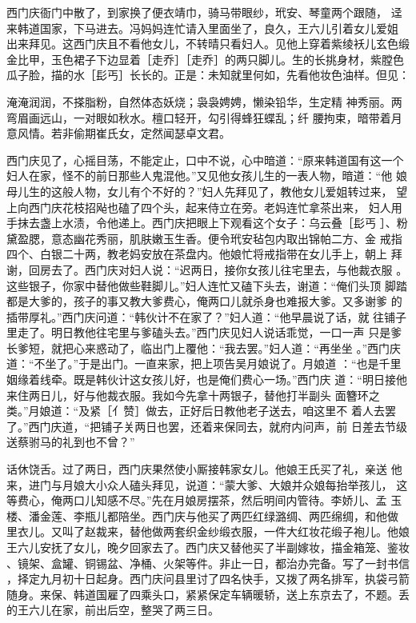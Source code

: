 西门庆衙门中散了，到家换了便衣靖巾，骑马带眼纱，玳安、琴童两个跟随，
迳来韩道国家，下马进去。冯妈妈连忙请入里面坐了，良久，王六儿引着女儿爱姐
出来拜见。这西门庆且不看他女儿，不转晴只看妇人。见他上穿着紫绫袄儿玄色缎
金比甲，玉色裙子下边显着［走乔］［走乔］的两只脚儿。生的长挑身材，紫膛色
瓜子脸，描的水［髟丐］长长的。正是：未知就里何如，先看他妆色油样。但见：

淹淹润润，不搽脂粉，自然体态妖烧；袅袅娉娉，懒染铅华，生定精
神秀丽。两弯眉画远山，一对眼如秋水。檀口轻开，勾引得蜂狂蝶乱；纤
腰拘束，暗带着月意风情。若非偷期崔氏女，定然闻瑟卓文君。

西门庆见了，心摇目荡，不能定止，口中不说，心中暗道：“原来韩道国有这一个
妇人在家，怪不的前日那些人鬼混他。”又见他女孩儿生的一表人物，暗道：“他
娘母儿生的这般人物，女儿有个不好的？”妇人先拜见了，教他女儿爱姐转过来，
望上向西门庆花枝招飐也磕了四个头，起来侍立在旁。老妈连忙拿茶出来，
妇人用手抹去盏上水渍，令他递上。西门庆把眼上下观看这个女子：乌云叠［髟丐
］、粉黛盈腮，意态幽花秀丽，肌肤嫩玉生香。便令玳安毡包内取出锦帕二方、金
戒指四个、白银二十两，教老妈安放在茶盘内。他娘忙将戒指带在女儿手上，朝上
拜谢，回房去了。西门庆对妇人说：“迟两日，接你女孩儿往宅里去，与他裁衣服
。这些银子，你家中替他做些鞋脚儿。”妇人连忙又磕下头去，谢道：“俺们头顶
脚踏都是大爹的，孩子的事又教大爹费心，俺两口儿就杀身也难报大爹。又多谢爹
的插带厚礼。”西门庆问道：“韩伙计不在家了？”妇人道：“他早晨说了话，就
往铺子里走了。明日教他往宅里与爹磕头去。”西门庆见妇人说话乖觉，一口一声
只是爹长爹短，就把心来惑动了，临出门上覆他：“我去罢。”妇人道：“再坐坐
。”西门庆道：“不坐了。”于是出门。一直来家，把上项告吴月娘说了。月娘道
：“也是千里姻缘着线牵。既是韩伙计这女孩儿好，也是俺们费心一场。”西门庆
道：“明日接他来住两日儿，好与他裁衣服。我如今先拿十两银子，替他打半副头
面簪环之类。”月娘道：“及紧［亻赞］做去，正好后日教他老子送去，咱这里不
着人去罢了。”西门庆道，“把铺子关两日也罢，还着来保同去，就府内问声，前
日差去节级送蔡驸马的礼到也不曾？”

话休饶舌。过了两日，西门庆果然使小厮接韩家女儿。他娘王氏买了礼，亲送
他来，进门与月娘大小众人磕头拜见，说道：“蒙大爹、大娘并众娘每抬举孩儿，
这等费心，俺两口儿知感不尽。”先在月娘房摆茶，然后明间内管待。李娇儿、孟
玉楼、潘金莲、李瓶儿都陪坐。西门庆与他买了两匹红绿潞绸、两匹绵绸，和他做
里衣儿。又叫了赵裁来，替他做两套织金纱缎衣服，一件大红妆花缎子袍儿。他娘
王六儿安抚了女儿，晚夕回家去了。西门庆又替他买了半副嫁妆，描金箱笼、鉴妆
、镜架、盒罐、铜锡盆、净桶、火架等件。非止一日，都治办完备。写了一封书信
，择定九月初十日起身。西门庆问县里讨了四名快手，又拨了两名排军，执袋弓箭
随身。来保、韩道国雇了四乘头口，紧紧保定车辆暖轿，送上东京去了，不题。丢
的王六儿在家，前出后空，整哭了两三日。

